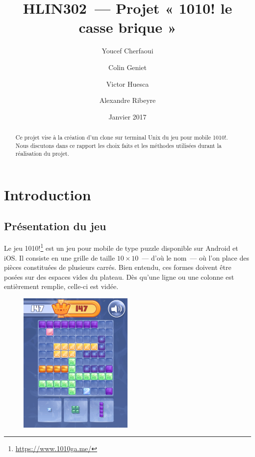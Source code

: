 \documentclass[11pt,a4paper]{article}
\begin{document}
\title{HLIN302~--- Projet « 1010! le casse brique »}
\author{Youcef Cherfaoui
	\and{Colin Geniet}
	\and{Victor Huesca}
	\and{Alexandre Ribeyre}}
\date{Janvier 2017}
\maketitle

\begin{abstract}
Ce projet vise à la création d'un clone sur terminal Unix du jeu pour mobile 1010!. Nous discutons dans ce rapport les choix faits et les méthodes utilisées durant la réalisation du projet.
\end{abstract}

\tableofcontents
\clearpage

\section*{Introduction}
\subsection*{Présentation du jeu}
Le jeu 1010!\footnote{\url{https://www.1010ga.me/}} est un jeu pour mobile de type puzzle disponible sur Android et iOS. Il consiste en une grille de taille $10\times10$~--- d'où le nom~--- où l'on place des pièces constituées de plusieurs carrés. Bien entendu, ces formes doivent être posées sur des espaces vides du plateau. Dès qu'une ligne ou une colonne est entièrement remplie, celle-ci est vidée.

\begin{figure}[h]
\centering
\includegraphics[width=0.5\textwidth]{image/1010_exemple.png}
\end{figure}
\end{document}
